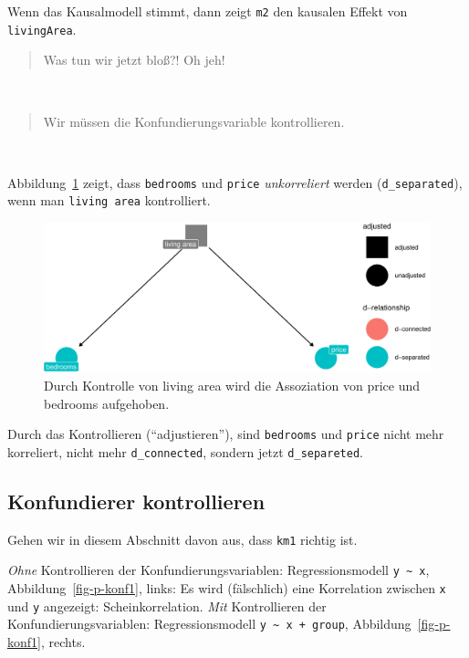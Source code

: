 \documentclass[
  a4paper,
  DIV=11]{scrreprt}
\theoremstyle{definition}
\theoremstyle{remark}
\begin{document}
Wenn das Kausalmodell stimmt, dann zeigt \texttt{m2} den kausalen Effekt
von \texttt{livingArea}.

\begin{quote}
Was tun wir jetzt bloß?! Oh jeh!
\end{quote}

🧑

\begin{quote}
Wir müssen die Konfundierungsvariable kontrollieren.
\end{quote}

👩

Abbildung~\ref{fig-km1-controlled} zeigt, dass \texttt{bedrooms} und
\texttt{price} \emph{unkorreliert} werden (\texttt{d\_separated}), wenn
man \texttt{living\ area} kontrolliert.

\begin{figure}

{\centering \includegraphics{./kausal_files/figure-pdf/fig-km1-controlled-1.pdf}

}

\caption{\label{fig-km1-controlled}Durch Kontrolle von living area wird
die Assoziation von price und bedrooms aufgehoben.}

\end{figure}

Durch das Kontrollieren (``adjustieren''), sind \texttt{bedrooms} und
\texttt{price} nicht mehr korreliert, nicht mehr \texttt{d\_connected},
sondern jetzt \texttt{d\_separeted}.

\hypertarget{konfundierer-kontrollieren}{%
\subsection{Konfundierer
kontrollieren}\label{konfundierer-kontrollieren}}

Gehen wir in diesem Abschnitt davon aus, dass \texttt{km1} richtig ist.

\emph{Ohne} Kontrollieren der Konfundierungsvariablen: Regressionsmodell
\texttt{y\ \textasciitilde{}\ x}, Abbildung~\ref{fig-p-konf1}, links: Es
wird (fälschlich) eine Korrelation zwischen \texttt{x} und \texttt{y}
angezeigt: Scheinkorrelation. \emph{Mit} Kontrollieren der
Konfundierungsvariablen: Regressionsmodell
\texttt{y\ \textasciitilde{}\ x\ +\ group}, Abbildung~\ref{fig-p-konf1},
rechts.
\end{document}
